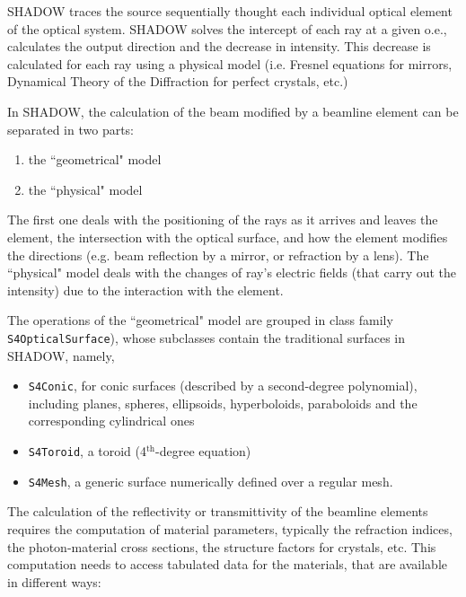 SHADOW traces the source sequentially thought each individual optical element of the optical system. SHADOW solves the intercept of each ray at a given o.e., calculates the output direction and the decrease in intensity. This decrease is calculated for each ray using a physical model (i.e. Fresnel equations for mirrors, Dynamical Theory of the Diffraction for perfect crystals, etc.)

In SHADOW, the  calculation of the beam modified by a beamline element can be separated in two parts: 
\begin{enumerate}
    \item the ``geometrical" model
    \item the ``physical" model
\end{enumerate}

The first one deals with the positioning of the rays as it arrives and leaves the element, the intersection with the optical surface, and how the element modifies the directions (e.g. beam reflection by a mirror, or refraction by a lens). The ``physical" model deals with the changes of ray's electric fields (that carry out the intensity) due to the interaction with the element. 

The operations of the ``geometrical" model are grouped in class family {\tt S4OpticalSurface}), whose subclasses contain the traditional surfaces in SHADOW, namely,
\begin{itemize}
    \item {\tt S4Conic}, for conic surfaces (described by a second-degree polynomial), including planes, spheres, ellipsoids, hyperboloids, paraboloids and the corresponding cylindrical ones \cite{S4Conic}
    \item {\tt S4Toroid}, a toroid (4$^\text{th}$-degree equation)
    \item {\tt S4Mesh}, a generic surface numerically defined over a regular mesh. 
\end{itemize}

The calculation of the reflectivity or transmittivity of the beamline elements requires the computation of material parameters, typically the refraction indices, the photon-material cross sections, the structure factors for crystals, etc. This computation needs to access tabulated data for the materials, that are available in different ways:

